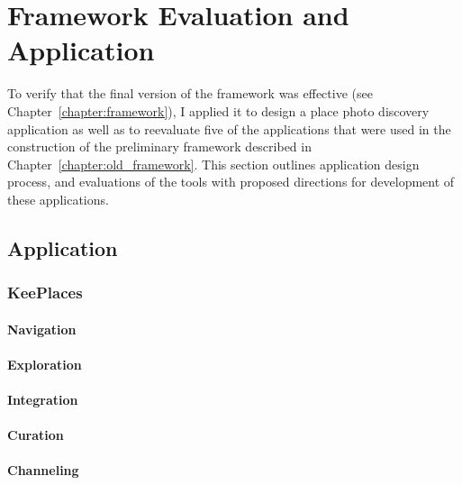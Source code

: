 \chapter{Framework Evaluation and Application}
\label{chapter:application}

To verify that the final version of the framework was effective (see Chapter~\ref{chapter:framework}), I applied it to design a place photo discovery application as well as to reevaluate five of the applications that were used in the construction of the preliminary framework described in Chapter~\ref{chapter:old_framework}. This section outlines application design process, and evaluations of the tools with proposed directions for development of these applications. 

{\section{Application}

{\subsection{KeePlaces}

{\subsubsection{Navigation}}
{\subsubsection{Exploration}}
{\subsubsection{Integration}}
{\subsubsection{Curation}}
{\subsubsection{Channeling}}

} %
} %



